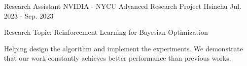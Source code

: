 

\begin{cventries}


  \cventry
  {Research Assistant} %
  {NVIDIA - NYCU Advanced Research Project} %
  {Hsinchu} %
  {Jul. 2023 - Sep. 2023} %
  {
    \begin{cvitems} %
      \item {Research Topic: Reinforcement Learning for Bayesian Optimization}
      \item {Helping design the algorithm and implement the experiments. We demonstrate that our work constantly achieves better performance than previous works.}
    \end{cvitems}
  }


\end{cventries}
